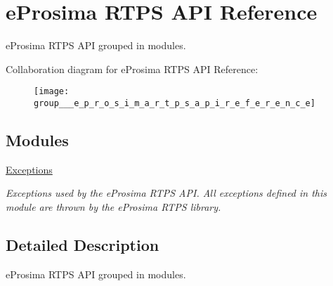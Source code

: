 \hypertarget{group___e_p_r_o_s_i_m_a_r_t_p_s_a_p_i_r_e_f_e_r_e_n_c_e}{\section{e\-Prosima \-R\-T\-P\-S \-A\-P\-I \-Reference}
\label{group___e_p_r_o_s_i_m_a_r_t_p_s_a_p_i_r_e_f_e_r_e_n_c_e}
}


e\-Prosima \-R\-T\-P\-S \-A\-P\-I grouped in modules.  


\-Collaboration diagram for e\-Prosima \-R\-T\-P\-S \-A\-P\-I \-Reference\-:\nopagebreak
\begin{figure}[H]
\begin{center}
\leavevmode
\texttt{[image: group\_\_\_e\_p\_r\_o\_s\_i\_m\_a\_r\_t\_p\_s\_a\_p\_i\_r\_e\_f\_e\_r\_e\_n\_c\_e]}
\end{center}
\end{figure}
\subsection*{\-Modules}
\begin{DoxyCompactItemize}
\item 
\hyperlink{group___e_x_c_e_p_t_i_o_n_m_o_d_u_l_e}{\-Exceptions}
\begin{DoxyCompactList}\small\item\em \-Exceptions used by the e\-Prosima \-R\-T\-P\-S \-A\-P\-I. \-All exceptions defined in this module are thrown by the e\-Prosima \-R\-T\-P\-S library. \end{DoxyCompactList}\end{DoxyCompactItemize}


\subsection{\-Detailed \-Description}
e\-Prosima \-R\-T\-P\-S \-A\-P\-I grouped in modules. 